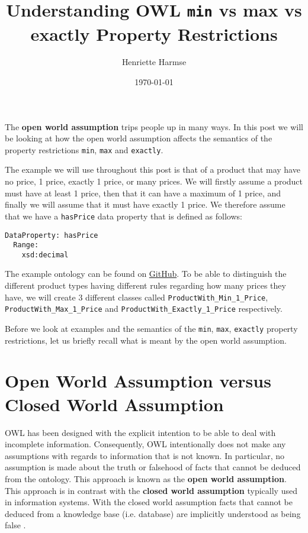\documentclass{amsart}
\title{Understanding OWL \texttt{min} vs max vs exactly Property Restrictions}
\author{Henriette Harmse}
\date{\today}
\begin{document}
  \maketitle
  
  The \textbf{open world assumption} trips people up in many ways. In this post we will be looking at how the open world assumption affects the semantics of the property restrictions \texttt{min}, \texttt{max} and \texttt{exactly}. 
   
  
  The example we will use throughout this post is that of a product that may have no price, 1 price, exactly 1 price, or many prices. We will firstly assume a product must have at least 1 price, then that it can have a maximum of 1 price, and finally we will assume that it must have exactly 1 price. We therefore assume that we have a \texttt{hasPrice} data property that is defined as follows:
\begin{small}
	\begin{verbatim} 
DataProperty: hasPrice
  Range: 
    xsd:decimal
	\end{verbatim}
\end{small}
  
  The example ontology can be found on \href{https://github.com/henrietteharmse/henrietteharmse/tree/master/blog/tutorial/ontologies/examples/Min_vs_Max_vs_Exactly.owl}{GitHub}. To be able to distinguish the different product types having different rules regarding how many prices they have, we will create 3 different classes called  \texttt{ProductWith\_Min\_1\_Price}, \texttt{ProductWith\_Max\_1\_Price} and \texttt{ProductWith\_Exactly\_1\_Price} respectively.
  

  Before we look at examples and the semantics of the \texttt{min}, \texttt{max}, \texttt{exactly} property restrictions, let us briefly recall what is meant by the open world assumption.
  
  \section{Open World Assumption versus Closed World Assumption}
OWL has been designed with the explicit intention to be able to deal with incomplete information. Consequently, OWL intentionally does not make any assumptions with regards to information that is not known.
In particular, no assumption is made about the truth or falsehood of facts that cannot be deduced from the ontology.
This approach is known as the \textbf{open world assumption}. This approach is in contrast with the \textbf{closed world assumption} typically used in information systems. 
With the closed world assumption facts that cannot be deduced from a knowledge base (i.e. database) are implicitly understood as being false \cite{Baader2007f,Krotzsch2012,Rudolph2011}.  
\end{document}
